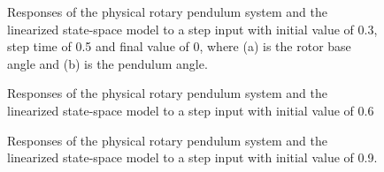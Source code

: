 \documentclass[12pt]{report}
\begin{document}
\begin{enumerate}[Question]
{\begin{figure}[htb!]
                  \caption{Responses of the physical rotary pendulum system and the linearized state-space model to a step input with initial value of 0.3, step time of 0.5 and final value of 0, where (a) is the rotor base angle and (b) is the pendulum angle.}
              \end{figure}
              \begin{figure}[htb!]
                  \centering
                   \quad \quad
                  \caption{Responses of the physical rotary pendulum system and the linearized state-space model to a step input with initial value of 0.6}
              \end{figure}
              \begin{figure}[htb!]
                  \centering
                   \quad \quad
                  \caption{Responses of the physical rotary pendulum system and the linearized state-space model to a step input with initial value of 0.9.}
              \end{figure}
          }
\end{enumerate}
\end{document}
